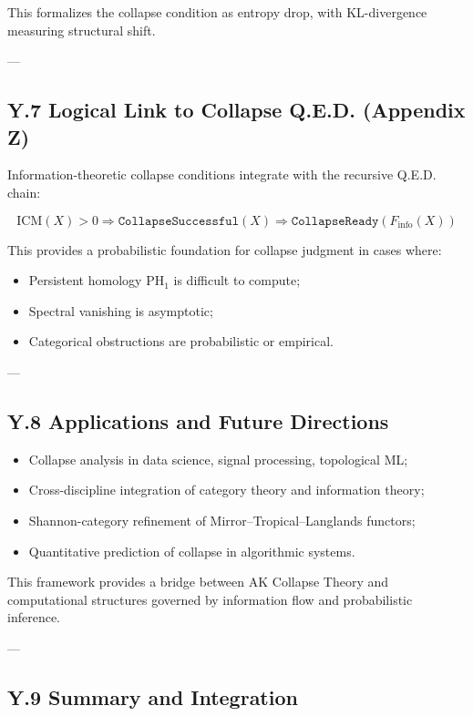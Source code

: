 \documentclass[11pt]{article}
\begin{document}
This formalizes the collapse condition as entropy drop, with KL-divergence measuring structural shift.

---

\subsection*{Y.7 Logical Link to Collapse Q.E.D. (Appendix Z)}

Information-theoretic collapse conditions integrate with the recursive Q.E.D. chain:

\[
\mathrm{ICM}(X) > 0 \Rightarrow \texttt{CollapseSuccessful}(X) \Rightarrow \texttt{CollapseReady}(F_{\mathrm{info}}(X))
\]

This provides a probabilistic foundation for collapse judgment in cases where:

\begin{itemize}
    \item Persistent homology \( \mathrm{PH}_1 \) is difficult to compute;
    \item Spectral vanishing is asymptotic;
    \item Categorical obstructions are probabilistic or empirical.
\end{itemize}

---

\subsection*{Y.8 Applications and Future Directions}

\begin{itemize}
    \item Collapse analysis in data science, signal processing, topological ML;
    \item Cross-discipline integration of category theory and information theory;
    \item Shannon-category refinement of Mirror–Tropical–Langlands functors;
    \item Quantitative prediction of collapse in algorithmic systems.
\end{itemize}

This framework provides a bridge between AK Collapse Theory and computational structures governed by information flow and probabilistic inference.

---

\subsection*{Y.9 Summary and Integration}
\end{document}
